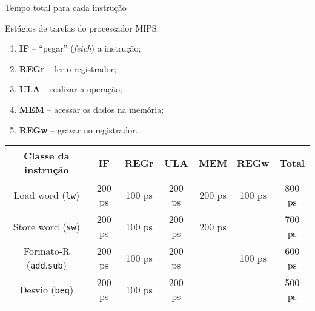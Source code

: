 \begin{frame}{Tempo total para cada instrução}

\footnotesize
Estágios de tarefas do processador MIPS:
\begin{enumerate}
\item {\bf IF} -- ``pegar'' ({\em fetch}) a instrução;
\item {\bf REGr} -- ler o registrador;
\item {\bf ULA} -- realizar a operação;
\item {\bf MEM} -- acessar os dados na memória;
\item {\bf REGw} -- gravar no registrador.
\end{enumerate}
\bigskip
\pause
  \begin{tabular}{|c|c|c|c|c|c|c|}\hline
    \bf Classe da instrução & \bf IF & \bf REGr & \bf ULA & \bf MEM &
    \bf REGw & \bf Total
    \\\hline\hline
    Load word ({\tt lw}) & 200 ps & 100 ps & 200 ps & 200 ps & 100 ps
    & 800 ps \\\hline
    Store word ({\tt sw}) & 200 ps & 100 ps & 200 ps & 200 ps & 
    & 700 ps \\\hline
    Formato-R ({\tt add},{\tt sub}) & 200 ps & 100 ps & 200 ps &  & 100 ps
    & 600 ps \\\hline
    Desvio ({\tt beq}) & 200 ps & 100 ps & 200 ps &  & 
    & 500 ps \\\hline
  \end{tabular}
  
\end{frame}

